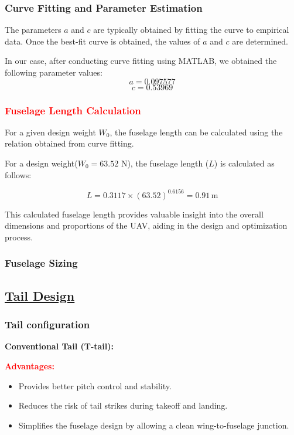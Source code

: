 \documentclass[12 pt]{article}
\begin{document}
{\subsubsection{Curve Fitting and Parameter Estimation}
\color{black}
The parameters \(a\) and \(c\) are typically obtained by fitting the curve to empirical data. Once the best-fit curve is obtained, the values of \(a\) and \(c\) are determined. 

In our case, after conducting curve fitting using MATLAB, we obtained the following parameter values:
\[ a = 0.097577 \]
\[ c = 0.53969 \] 
\subsubsection{\textcolor{red}{Fuselage Length Calculation}}
\color{black}
For a given design weight \(W_0\), the fuselage length can be calculated using the relation obtained from curve fitting. 

For a design weight(\(W_0 = 63.52\) N), the fuselage length (\(L\)) is calculated as follows:

\[
L = 0.3117 \times (63.52)^{0.6156} = 0.91 \, \text{m}
\]

This calculated fuselage length provides valuable insight into the overall dimensions and proportions of the UAV, aiding in the design and optimization process.
\color{red}
\subsubsection{Fuselage Sizing}
\color{black}
\vspace{10mm}
\subsection{\underline{Tail Design}}
\color{red}
\subsubsection{Tail configuration}

{\color{red}\textbf{Conventional Tail (T-tail):}}

{\color{black}
\textbf{\textcolor{red}{Advantages:}}
\begin{itemize}
  \item Provides better pitch control and stability.
  \item Reduces the risk of tail strikes during takeoff and landing.
  \item Simplifies the fuselage design by allowing a clean wing-to-fuselage junction.
\end{itemize}

}}
\end{document}
